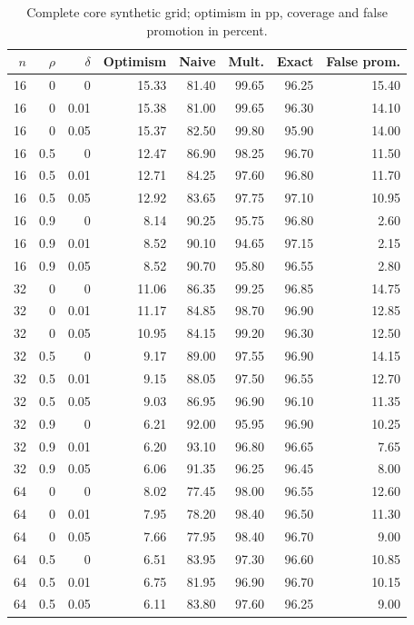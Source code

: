 \begin{longtable}{rrrrrrrr}
\caption{Complete core synthetic grid; optimism in pp, coverage and false promotion in percent.}\label{tab:core}\\
\toprule
$n$ & $\rho$ & $\delta$ & Optimism & Naive & Mult. & Exact & False prom. \\
\midrule\endhead
16 & 0 & 0 & 15.33 & 81.40 & 99.65 & 96.25 & 15.40 \\
16 & 0 & 0.01 & 15.38 & 81.00 & 99.65 & 96.30 & 14.10 \\
16 & 0 & 0.05 & 15.37 & 82.50 & 99.80 & 95.90 & 14.00 \\
16 & 0.5 & 0 & 12.47 & 86.90 & 98.25 & 96.70 & 11.50 \\
16 & 0.5 & 0.01 & 12.71 & 84.25 & 97.60 & 96.80 & 11.70 \\
16 & 0.5 & 0.05 & 12.92 & 83.65 & 97.75 & 97.10 & 10.95 \\
16 & 0.9 & 0 & 8.14 & 90.25 & 95.75 & 96.80 & 2.60 \\
16 & 0.9 & 0.01 & 8.52 & 90.10 & 94.65 & 97.15 & 2.15 \\
16 & 0.9 & 0.05 & 8.52 & 90.70 & 95.80 & 96.55 & 2.80 \\
32 & 0 & 0 & 11.06 & 86.35 & 99.25 & 96.85 & 14.75 \\
32 & 0 & 0.01 & 11.17 & 84.85 & 98.70 & 96.90 & 12.85 \\
32 & 0 & 0.05 & 10.95 & 84.15 & 99.20 & 96.30 & 12.50 \\
32 & 0.5 & 0 & 9.17 & 89.00 & 97.55 & 96.90 & 14.15 \\
32 & 0.5 & 0.01 & 9.15 & 88.05 & 97.50 & 96.55 & 12.70 \\
32 & 0.5 & 0.05 & 9.03 & 86.95 & 96.90 & 96.10 & 11.35 \\
32 & 0.9 & 0 & 6.21 & 92.00 & 95.95 & 96.90 & 10.25 \\
32 & 0.9 & 0.01 & 6.20 & 93.10 & 96.80 & 96.65 & 7.65 \\
32 & 0.9 & 0.05 & 6.06 & 91.35 & 96.25 & 96.45 & 8.00 \\
64 & 0 & 0 & 8.02 & 77.45 & 98.00 & 96.55 & 12.60 \\
64 & 0 & 0.01 & 7.95 & 78.20 & 98.40 & 96.50 & 11.30 \\
64 & 0 & 0.05 & 7.66 & 77.95 & 98.40 & 96.70 & 9.00 \\
64 & 0.5 & 0 & 6.51 & 83.95 & 97.30 & 96.60 & 10.85 \\
64 & 0.5 & 0.01 & 6.75 & 81.95 & 96.90 & 96.70 & 10.15 \\
64 & 0.5 & 0.05 & 6.11 & 83.80 & 97.60 & 96.25 & 9.00 \\

\end{longtable}
